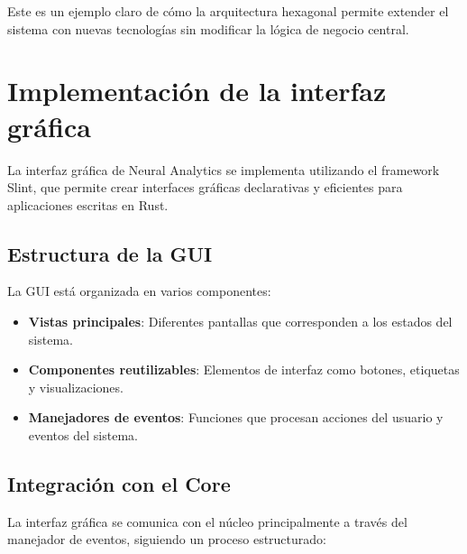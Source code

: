 Este es un ejemplo claro de cómo la arquitectura hexagonal permite extender el sistema con nuevas tecnologías sin modificar la lógica de negocio central.

\section{Implementación de la interfaz gráfica}

La interfaz gráfica de Neural Analytics se implementa utilizando el framework Slint, que permite crear interfaces gráficas declarativas y eficientes para aplicaciones escritas en Rust.

\subsection{Estructura de la GUI}

La GUI está organizada en varios componentes:

\begin{itemize}
    \item \textbf{Vistas principales}: Diferentes pantallas que corresponden a los estados del sistema.
    \item \textbf{Componentes reutilizables}: Elementos de interfaz como botones, etiquetas y visualizaciones.
    \item \textbf{Manejadores de eventos}: Funciones que procesan acciones del usuario y eventos del sistema.
\end{itemize}

\subsection{Integración con el Core}

La interfaz gráfica se comunica con el núcleo principalmente a través del manejador de eventos, siguiendo un proceso estructurado:

